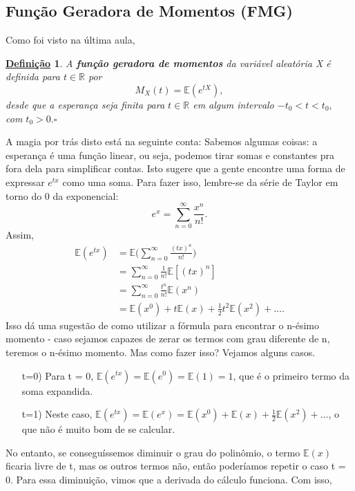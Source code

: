 \documentclass{article}
\newtheorem*{def*}{\underline{Defini\c c\~ao}}
\begin{document}
\subsection{Função Geradora de Momentos (FMG)}
  Como foi visto na última aula, 
\begin{def*}
  A \textbf{função geradora de momentos} da variável aleatória X é definida para \(t\in \mathbb{R}\) por 
  \[
    M_{X}(t) = \mathbb{E}(e^{tX}),
  \]
  desde que a esperança seja finita para \(t\in \mathbb{R}\) em algum intervalo \(-t_{0} < t < t_{0},\) com \(t_{0} > 0.\square\)
\end{def*}
  A magia por trás disto está na seguinte conta: 
  Sabemos algumas coisas: a esperança é uma função linear, ou seja, podemos tirar somas e constantes pra fora dela para simplificar contas.
Isto sugere que a gente encontre uma forma de expressar \(e^{tx}\) como uma soma. Para fazer isso, lembre-se da série de Taylor em torno do 0 da exponencial:
  \[
    e^{x} = \sum\limits_{n=0}^{\infty}\frac{x^{n}}{n!}.
  \]
  Assim, 
 \begin{align*}
   \mathbb{E}(e^{tx}) &= \mathbb{E}\biggl(\sum\limits_{n=0}^{\infty}\frac{(tx)^{n}}{n!}\biggr)\\
                      &= \sum\limits_{n=0}^{\infty}\frac{1}{n!}\mathbb{E}[(tx)^{n}]\\
                      &= \sum\limits_{n=0}^{\infty}\frac{t^{n}}{n!}\mathbb{E}(x^{n})\\
                      &= \mathbb{E}(x^{0}) + t \mathbb{E}(x) + \frac{1}{2}t^{2} \mathbb{E}(x^{2}) + \dotsc.
 \end{align*}
  Isso dá uma sugestão de como utilizar a fórmula para encontrar o n-ésimo momento - caso sejamos capazes de zerar os termos com grau diferente de n,
teremos o n-ésimo momento. Mas como fazer isso? Vejamos alguns casos.
\begin{itemize}
  \item[t=0)] Para t = 0, \(\mathbb{E}(e^{tx}) = \mathbb{E}(e^{0}) = \mathbb{E}(1) = 1\), que é o primeiro termo da soma expandida.
  \item[t=1)] Neste caso, \(\mathbb{E}(e^{tx}) = \mathbb{E}(e^{x}) = \mathbb{E}(x^{0}) + \mathbb{E}(x) + \frac{1}{2}\mathbb{E}(x^{2}) + \dotsc\), o que não
é muito bom de se calcular. 
\end{itemize}
  No entanto, se conseguíssemos diminuir o grau do polinômio, o termo \(\mathbb{E}(x)\) ficaria livre de t, mas os outros termos não,
então poderíamos repetir o caso t = 0. Para essa diminuição, vimos que a derivada do cálculo funciona. Com isso, 
\end{document}
